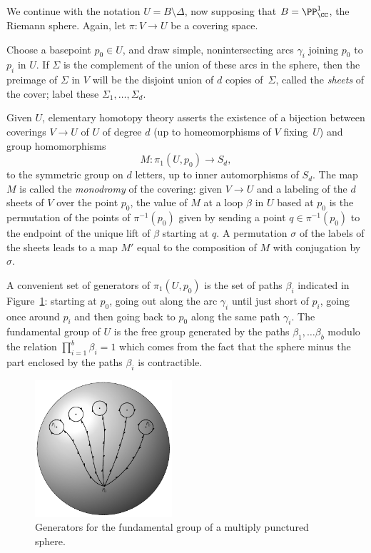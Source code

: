 We continue with the notation $U = B\setminus \Delta$, now supposing
%
that $B = \PP^1_\CC$, the Riemann sphere. Again, let $\pi:V\to U$ be a
covering space.

Choose a basepoint $p_0 \in U$, and draw simple, nonintersecting arcs
$\gamma_i$ joining $p_0$ to $p_i$ in $U$. If $\Sigma$ is the complement
of the union of these arcs in the sphere, then the preimage of $\Sigma$
in $V$ will be the disjoint union of $d$ copies of~$\Sigma$, called the
%
\emph{sheets} of the cover; label these $\Sigma_1,\dots,\Sigma_d$.

Given $U$, elementary homotopy theory asserts the existence of a bijection
between coverings $V \to U$ of $U$ of degree $d$ (up to homeomorphisms
of $V$ fixing~$U$) and group
homomorphisms
   $$
 M:  \pi_1(U, p_0) \to S_d,
   $$
to the symmetric group on $d$ letters, up to inner automorphisms of
%
%
$S_{d}$. The map $M$ is called the \emph{monodromy} of the covering:
given $V \to U$
and a labeling of the $d$ sheets of $V$ over the point
$p_0$, the value of $M$ at a loop  $\beta$ in $U$ based at $p_0$
is the
permutation of the points of $\pi^{-1}(p_0)$ given by sending a point
$q \in \pi^{-1}(p_0)$ to the endpoint of the unique lift of $\beta$
starting at $q$. A permutation $\sigma$ of the labels  of the sheets
leads to a map $M'$ equal to the composition of $M$ with conjugation
by $\sigma$.

A convenient set of generators of $ \pi_1(U, p_0)$ is the set of paths
$\beta_i$ indicated in Figure~\ref{pi 1 generators}: starting at $p_0$,
going out along the arc $\gamma_i$ until just short of $p_i$, going
once around $p_i$ and then going back to $p_0$ along the same path
$\gamma_i$. The fundamental group
%
%
 of $U$ is the free group generated
by the paths $\beta_1,\dots \beta_b$ \null modulo the relation $\prod_{i=1}^b
\beta_i = 1$
which comes from the fact that the sphere minus the part enclosed by
the paths $\beta_i$ is
contractible.
{\meshing\par}

\begin{figure}
\centerline{\includegraphics[height=2in]{main/Fig05-1}}
 \caption{Generators for the fundamental group of a multiply punctured
 sphere.}
 \label{pi 1 generators}
\end{figure}

